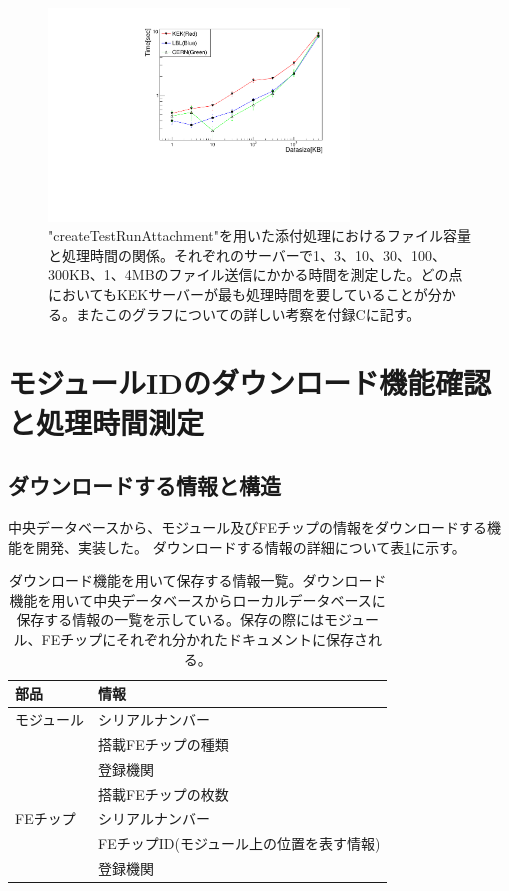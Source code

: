 \begin{figure}[bpt]\centering
  \begin{center}
    \includegraphics[width=8cm,angle=270]{datasize_vs_time_new.pdf}
  \caption["createTestRunAttachment"を用いた添付処理におけるファイル容量と処理時間の関係]{"createTestRunAttachment"を用いた添付処理におけるファイル容量と処理時間の関係。それぞれのサーバーで1、3、10、30、100、300KB、1、4MBのファイル送信にかかる時間を測定した。どの点においてもKEKサーバーが最も処理時間を要していることが分かる。またこのグラフについての詳しい考察を付録Cに記す。}
  \label{datasize_vs_time}
  \end{center}
\end{figure}

\newpage
\section{モジュールIDのダウンロード機能確認と処理時間測定}
\subsection{ダウンロードする情報と構造}
中央データベースから、モジュール及びFEチップの情報をダウンロードする機能を開発、実装した。
ダウンロードする情報の詳細について表\ref{download_information}に示す。

\begin{table}[tbp]
\begin{center}
\caption[ダウンロード機能を用いて保存する情報一覧。]{ダウンロード機能を用いて保存する情報一覧。ダウンロード機能を用いて中央データベースからローカルデータベースに保存する情報の一覧を示している。保存の際にはモジュール、FEチップにそれぞれ分かれたドキュメントに保存される。}
\label{download_information}
  \begin{tabular}{|ll|} \hline
    部品 & 情報 \\ \hline
    モジュール & シリアルナンバー \\ 
     & 搭載FEチップの種類  \\ 
     & 登録機関  \\ 
     & 搭載FEチップの枚数  \\ \hline 
    FEチップ & シリアルナンバー \\
     & FEチップID(モジュール上の位置を表す情報) \\  
     & 登録機関 \\ \hline 
  \end{tabular}
\end{center}
\end{table}

